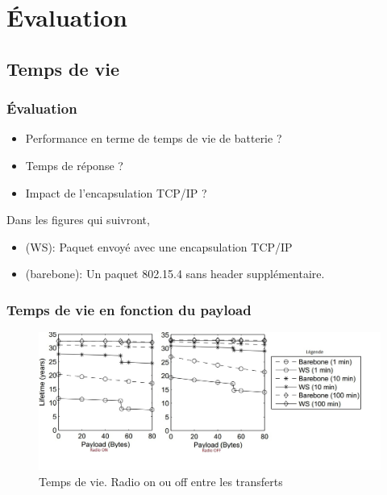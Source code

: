\section{Évaluation}
\subsection{Temps de vie}
\begin{frame}
\frametitle{Évaluation}
\begin{itemize}
 \item Performance en terme de temps de vie de batterie ?
 \item Temps de réponse ?
 \item Impact de l'encapsulation TCP/IP ?
\end{itemize}
\vspace{5mm}
Dans les figures qui suivront,
\begin{itemize}
 \item (WS): Paquet envoyé avec une encapsulation TCP/IP %
 \item (barebone): Un paquet 802.15.4 sans header supplémentaire.
\end{itemize}
\end{frame}

\begin{frame}
 \frametitle{Temps de vie en fonction du payload}
 \begin{figure}
  \centering
  \includegraphics[scale=0.35]{figures/tempsvie.jpg}
  \caption{Temps de vie. Radio on ou off entre les transferts}
 \end{figure} 
\end{frame}

